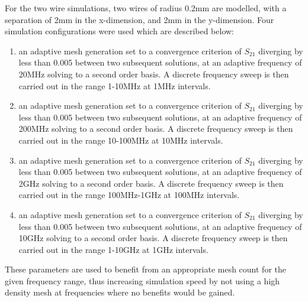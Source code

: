 For the two wire simulations, two wires of radius 0.2mm are modelled, with a separation of 2mm in the x-dimension, and 2mm in the y-dimension. Four simulation configurations were used which are described below:

\begin{enumerate}
\item{an adaptive mesh generation set to a convergence criterion of $S_{21}$ diverging by less than 0.005 between two subsequent solutions, at an adaptive frequency of 20MHz solving to a second order basis. A discrete frequency sweep is then carried out in the range 1-10MHz at 1MHz intervals.}
\item{an adaptive mesh generation set to a convergence criterion of $S_{21}$ diverging by less than 0.005 between two subsequent solutions, at an adaptive frequency of 200MHz solving to a second order basis. A discrete frequency sweep is then carried out in the range 10-100MHz at 10MHz intervals.}
\item{an adaptive mesh generation set to a convergence criterion of $S_{21}$ diverging by less than 0.005 between two subsequent solutions, at an adaptive frequency of 2GHz solving to a second order basis. A discrete frequency sweep is then carried out in the range 100MHz-1GHz at 100MHz intervals.}
\item{an adaptive mesh generation set to a convergence criterion of $S_{21}$ diverging by less than 0.005 between two subsequent solutions, at an adaptive frequency of 10GHz solving to a second order basis. A discrete frequency sweep is then carried out in the range 1-10GHz at 1GHz intervals.}
\end{enumerate}

These parameters are used to benefit from an appropriate mesh count for the given frequency range, thus increasing simulation speed by not using a high density mesh at frequencies where no benefits would be gained.

